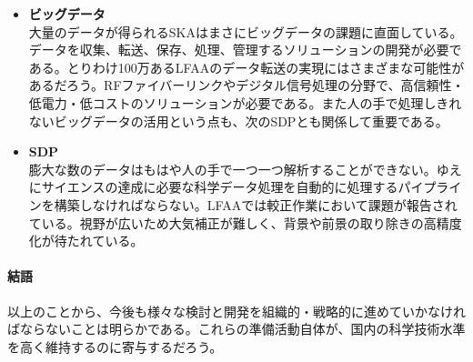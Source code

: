 \begin{itemize}
\item {\bf ビッグデータ}\\
大量のデータが得られるSKAはまさにビッグデータの課題に直面している。データを収集、転送、保存、処理、管理するソリューションの開発が必要である。とりわけ100万あるLFAAのデータ転送の実現にはさまざまな可能性があるだろう。RFファイバーリンクやデジタル信号処理の分野で、高信頼性・低電力・低コストのソリューションが必要である。また人の手で処理しきれないビッグデータの活用という点も、次のSDPとも関係して重要である。
\item {\bf SDP}\\
膨大な数のデータはもはや人の手で一つ一つ解析することができない。ゆえにサイエンスの達成に必要な科学データ処理を自動的に処理するパイプラインを構築しなければならない。LFAAでは較正作業において課題が報告されている。視野が広いため大気補正が難しく、背景や前景の取り除きの高精度化が待たれている。
\end{itemize}

\paragraph{結語}

以上のことから、今後も様々な検討と開発を組織的・戦略的に進めていかなければならないことは明らかである。これらの準備活動自体が、国内の科学技術水準を高く維持するのに寄与するだろう。
